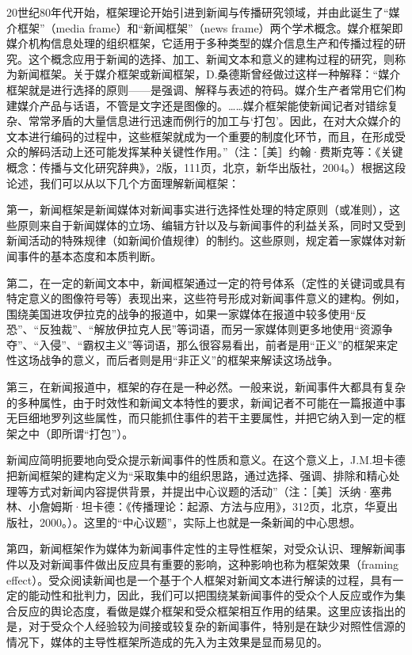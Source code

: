 \documentclass[UTF8,12pt]{ctexart}
\numberwithin{equation}{section} %
\numberwithin{figure}{section}
\numberwithin{table}{section}
\begin{document}
	20世纪80年代开始，框架理论开始引进到新闻与传播研究领域，并由此诞生了“媒介框架”（media frame）和“新闻框架”（news frame）两个学术概念。媒介框架即媒介机构信息处理的组织框架，它适用于多种类型的媒介信息生产和传播过程的研究。这个概念应用于新闻的选择、加工、新闻文本和意义的建构过程的研究，则称为新闻框架。关于媒介框架或新闻框架，D.桑德斯曾经做过这样一种解释：“媒介框架就是进行选择的原则——是强调、解释与表述的符码。媒介生产者常用它们构建媒介产品与话语，不管是文字还是图像的。……媒介框架能使新闻记者对错综复杂、常常矛盾的大量信息进行迅速而例行的加工与‘打包’。因此，在对大众媒介的文本进行编码的过程中，这些框架就成为一个重要的制度化环节，而且，在形成受众的解码活动上还可能发挥某种关键性作用。”（注：［美］约翰·费斯克等：《关键概念：传播与文化研究辞典》，2版，111页，北京，新华出版社，2004。）根据这段论述，我们可以从以下几个方面理解新闻框架：
	
	第一，新闻框架是新闻媒体对新闻事实进行选择性处理的特定原则（或准则），这些原则来自于新闻媒体的立场、编辑方针以及与新闻事件的利益关系，同时又受到新闻活动的特殊规律（如新闻价值规律）的制约。这些原则，规定着一家媒体对新闻事件的基本态度和本质判断。
	
	第二，在一定的新闻文本中，新闻框架通过一定的符号体系（定性的关键词或具有特定意义的图像符号等）表现出来，这些符号形成对新闻事件意义的建构。例如，围绕美国进攻伊拉克的战争的报道中，如果一家媒体在报道中较多使用“反恐”、“反独裁”、“解放伊拉克人民”等词语，而另一家媒体则更多地使用“资源争夺”、“入侵”、“霸权主义”等词语，那么很容易看出，前者是用“正义”的框架来定性这场战争的意义，而后者则是用“非正义”的框架来解读这场战争。
	
	第三，在新闻报道中，框架的存在是一种必然。一般来说，新闻事件大都具有复杂的多种属性，由于时效性和新闻文本特性的要求，新闻记者不可能在一篇报道中事无巨细地罗列这些属性，而只能抓住事件的若干主要属性，并把它纳入到一定的框架之中（即所谓“打包”）。
	
	新闻应简明扼要地向受众提示新闻事件的性质和意义。在这个意义上，J.M.坦卡德把新闻框架的建构定义为“采取集中的组织思路，通过选择、强调、排除和精心处理等方式对新闻内容提供背景，并提出中心议题的活动”（注：［美］沃纳·塞弗林、小詹姆斯·坦卡德：《传播理论：起源、方法与应用》，312页，北京，华夏出版社，2000。）。这里的“中心议题”，实际上也就是一条新闻的中心思想。
	
	第四，新闻框架作为媒体为新闻事件定性的主导性框架，对受众认识、理解新闻事件以及对新闻事件做出反应具有重要的影响，这种影响也称为框架效果（framing effect）。受众阅读新闻也是一个基于个人框架对新闻文本进行解读的过程，具有一定的能动性和批判力，因此，我们可以把围绕某新闻事件的受众个人反应或作为集合反应的舆论态度，看做是媒介框架和受众框架相互作用的结果。这里应该指出的是，对于受众个人经验较为间接或较复杂的新闻事件，特别是在缺少对照性信源的情况下，媒体的主导性框架所造成的先入为主效果是显而易见的。
	
\end{document}
